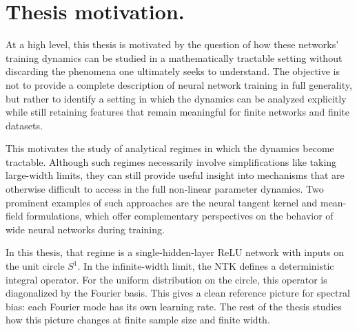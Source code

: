 \section{Thesis motivation.}
At a high level, this thesis is motivated by the question of how these networks'
training dynamics can be studied in a mathematically tractable setting without
discarding the phenomena one ultimately seeks to understand. The objective is
not to provide a complete description of neural network training in full
generality, but rather to identify a setting in which the dynamics can be
analyzed explicitly while still retaining features that remain meaningful for
finite networks and finite datasets.

This motivates the study of analytical regimes in which the dynamics become
tractable. Although such regimes necessarily involve simplifications like
taking large-width limits, they can still provide useful insight into mechanisms that
are otherwise difficult to access in the full non-linear parameter dynamics.
Two prominent examples of such approaches are the neural tangent kernel and mean-field
formulations, which offer complementary perspectives on the behavior of wide
neural networks during training.

In this thesis, that regime is a single-hidden-layer ReLU network with inputs
on the unit circle \(S^1\). In the infinite-width limit, the NTK defines a
deterministic integral operator. For the uniform distribution on the circle,
this operator is diagonalized by the Fourier basis. This gives a clean
reference picture for spectral bias: each Fourier mode has its own learning
rate. The rest of the thesis studies how this picture changes at finite sample
size and finite width.
